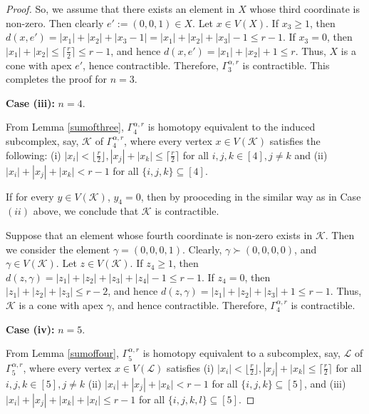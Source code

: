 \documentclass{amsart}
\theoremstyle{definition}
\theoremstyle{remark}
\numberwithin{equation}{section}
\newcommand{\f}{\lfloor\frac{r}{2}\rfloor}
\newcommand{\cil}{\lceil\frac{r}{2}\rceil}
\newcommand{\samir}[1]{\textcolor{cyan!65!black}{#1}}
\begin{document}
\begin{proof}
        So, we assume that there exists an element in $X$ whose third coordinate is non-zero. Then clearly $e':= (0, 0, 1)\in X$. Let $x \in V(X)$. If $x_3 \geq 1$, then 
	$d(x,e') = |x_1| + |x_2| + |x_3 - 1| = |x_1| + |x_2| + |x_3| - 1 \leq r - 1.$
	If $x_3 = 0$, then $|x_1| + |x_2| \leq \cil \leq r - 1$, and hence $d(x, e') = |x_1| + |x_2| + 1 \leq r.$ Thus, $X$ is a cone with apex $e'$, hence contractible. Therefore, $\Gamma_3^{\alpha,r}$ is contractible. This completes the proof for $n = 3$. 
	
	\smallskip
	
	\noindent\textbf{Case (iii):}  $n = 4$.
	
	
	From Lemma \ref{sumofthree},  $\Gamma_4^{\alpha,r}$ is homotopy equivalent to the induced subcomplex, say, $\mathcal{K}$ of $\Gamma_4^{\alpha,r}$,  where every vertex  $x \in V(\mathcal{K})$ satisfies the following: (i) $|x_i|< \f, |x_j|+|x_k|\leq \cil$ for all $i, j, k \in [4], j \neq k$  and (ii) $|x_i| + |x_j| + |x_k| < r-1$ for all  $\{i, j, k \}\subseteq [4]$.
	
	If for every $y \in V(\mathcal{K})$, $y_4 = 0$, then by prooceding in the similar way as in Case $(ii)$ above, we conclude that $\mathcal{K}$ is contractible.
    
    Suppose that an element whose fourth coordinate is non-zero exists in $\mathcal{K}$. Then we consider the element $\gamma = (0, 0, 0, 1)$. Clearly, $\gamma\succ (0,0,0,0)$, and $\gamma\in V(\mathcal{K})$. 
	Let $z \in V(\mathcal{K})$. If $z_4 \geq 1$, then $d(z, \gamma) = |z_1| + |z_2| + |z_3| + |z_4| - 1 \leq r - 1.$ If $z_4 = 0$, then $|z_1| + |z_2| + |z_3| \leq r - 2$, and hence $d(z, \gamma) = |z_1| + |z_2| + |z_3| + 1 \leq r - 1.$ Thus, $\mathcal{K}$ is a cone with apex $\gamma$, and hence contractible. Therefore, $\Gamma_4^{\alpha,r}$ is contractible. 
	
	\smallskip
	
	\noindent\textbf{Case (iv):}  $n = 5$.
	
	From Lemma \ref{sumoffour}, $\Gamma_5^{\alpha,r}$ is homotopy equivalent to a subcomplex, say, $\mathcal{L}$ of $\Gamma_5^{\alpha,r}$, where every vertex $x\in V(\mathcal{L})$ satisfies (i) $|x_i|< \f, |x_j|+|x_k|\leq \cil$ for all $i, j, k \in [5], j \neq k$ (ii) $|x_i| + |x_j| + |x_k| < r-1$ for all $\{i, j, k\}\subseteq [5]$, and (iii) $|x_i| + |x_j| + |x_k| + |x_l|\leq r-1$ for all  $\{i, j, k, l\} \subseteq [5]$. 
	

\end{proof}
\end{document}

